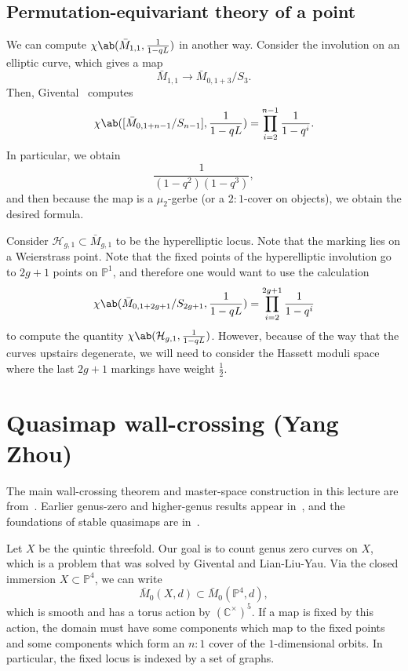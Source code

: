 \documentclass{amsart}
\theoremstyle{definition}
\theoremstyle{remark}
\theoremstyle{plain}
\theoremstyle{definition}
\theoremstyle{remark}
\newcommand{\C}{\mathbb{C}}
\renewcommand{\P}{\mathbb{P}}
\newcommand{\mc}[1]{\mathcal{#1}}
\newcommand{\1}{\mathbf{1}}
\newcommand{\2}{\mathbf{2}}
\newcommand{\3}{\mathbf{3}}
\begin{document}
\subsection{Permutation-equivariant theory of a point}%
\label{sub:Permutation-equivariant theory of a point}

We can compute \(\chi\ab(\bar{M}_{1,1}, \frac{1}{1-q L})\) in another way. Consider the involution on an elliptic curve, which gives a map
\[ \bar{M}_{1,1} \to \bar{M}_{0,1+3}/S_3. \]
Then, Givental~\cite{Givental2017K1} computes
\[ \chi\ab([\bar{M}_{0,1+n-1}/S_{n-1}], \frac{1}{1-qL}) = \prod_{i=2}^{n-1} \frac{1}{1-q^i}. \]
In particular, we obtain
\[ \frac{1}{(1-q^2)(1-q^3)}, \]
and then because the map is a \(\mu_2\)-gerbe (or a \(2:1\)-cover on objects), we obtain the desired formula.

Consider \(\mc{H}_{g,1} \subset \bar{M}_{g,1}\) to be the hyperelliptic locus. Note that the marking lies on a Weierstrass point. Note that the fixed points of the hyperelliptic involution go to \(2g+1\) points on \(\P^1\), and therefore one would want to use the calculation
\[ \chi\ab(\bar{M}_{0,1+2g+1}/S_{2g+1}, \frac{1}{1-q L}) = \prod_{i=2}^{2g+1} \frac{1}{1-q^i} \]
to compute the quantity
\(\chi\ab(\mc{H}_{g,1}, \frac{1}{1-qL})\). However, because of the way that the curves upstairs degenerate, we will need to consider the Hassett moduli space~\cite{Hassett2003} where the last \(2g+1\) markings have weight \(\frac{1}{2}\).
 






\section{Quasimap wall-crossing (Yang Zhou)}%
\label{sec:Quasimap wall-crossing (Yang Zhou)}

The main wall-crossing theorem and master-space construction in this lecture are from~\cite{Zhou2022}. Earlier genus-zero and higher-genus results appear in~\cite{CFK2014,CFK2020}, and the foundations of stable quasimaps are in~\cite{CFKM2014}.

Let \(X\) be the quintic threefold. Our goal is to count genus zero curves on \(X\), which is a problem that was solved by Givental and Lian-Liu-Yau. Via the closed immersion \(X \subset \P^4\), we can write
\[ \bar{M}_0(X, d) \subset \bar{M}_0(\P^4, d), \]
which is smooth and has a torus action by \((\C^{\times})^5\). If a map is fixed by this action, the domain must have some components which map to the fixed points and some components which form an \(n :1\) cover of the \(1\)-dimensional orbits. In particular, the fixed locus is indexed by a set of graphs.
\end{document}

